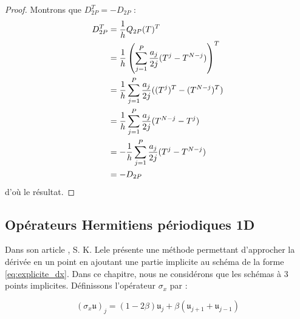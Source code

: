 \begin{proof}
Montrons que $D_{2P}^T = - D_{2P}$ :
\begin{align*}
D_{2P}^T & = \dfrac{1}{h} Q_{2P}(T)^T \\
	& = \dfrac{1}{h} \left( \displaystyle\sum\limits_{j=1}^P \dfrac{a_j}{2j} (T^j - T^{N-j}) \right)^T\\
	& = \dfrac{1}{h}\displaystyle\sum\limits_{j=1}^P \dfrac{a_j}{2j} ((T^j)^T - (T^{N-j})^T) \\
	& = \dfrac{1}{h}\displaystyle\sum\limits_{j=1}^P \dfrac{a_j}{2j} (T^{N-j} - T^{j}) \\
	& = - \dfrac{1}{h} \displaystyle\sum\limits_{j=1}^P \dfrac{a_j}{2j} (T^j - T^{N-j}) \\
	& = - D_{2P}
\end{align*}
d'où le résultat.
\end{proof}





























\subsection{Opérateurs Hermitiens périodiques 1D}

Dans son article \cite{Lele1991}, S. K. Lele présente une méthode permettant d'approcher la dérivée en un point en ajoutant une partie implicite au schéma de la forme \eqref{eq:explicite_dx}. Dans ce chapitre, nous ne considérons que les schémas à 3 points implicites. Définissons l'opérateur $\sigma_{x}$ par :

\begin{equation}
(\sigma_{x} \mathfrak{u})_j = (1-2\beta) \mathfrak{u}_j + \beta \left( \mathfrak{u}_{j+1} + \mathfrak{u}_{j-1} \right)
\end{equation}

